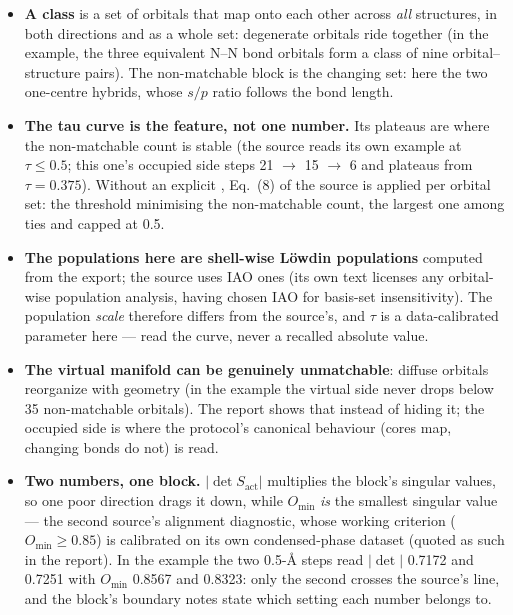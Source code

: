 \begin{readbox}
\begin{itemize}
  \item \textbf{A class} is a set of orbitals that map onto each other across
    \emph{all} structures, in both directions and as a whole set: degenerate
    orbitals ride together (in the example, the three equivalent N--N bond
    orbitals form a class of nine orbital--structure pairs).  The
    non-matchable block is the changing set: here the two one-centre hybrids,
    whose $s/p$ ratio follows the bond length.
  \item \textbf{The tau curve is the feature, not one number.}  Its plateaus
    are where the non-matchable count is stable (the source reads its own
    example at $\tau \le 0.5$; this one's occupied side steps 21 $\to$ 15
    $\to$ 6 and plateaus from $\tau = 0.375$).  Without an explicit
    , Eq.~(8) of the source is applied per orbital set: the
    threshold minimising the non-matchable count, the largest one among ties
    and capped at 0.5.
  \item \textbf{The populations here are shell-wise L\"owdin populations}
    computed from the export; the source uses IAO ones (its own text licenses
    any orbital-wise population analysis, having chosen IAO for basis-set
    insensitivity).  The population \emph{scale} therefore differs from the
    source's, and $\tau$ is a data-calibrated parameter here --- read the
    curve, never a recalled absolute value.
  \item \textbf{The virtual manifold can be genuinely unmatchable}: diffuse
    orbitals reorganize with geometry (in the example the virtual side never
    drops below 35 non-matchable orbitals).  The report shows that instead of
    hiding it; the occupied side is where the protocol's canonical behaviour
    (cores map, changing bonds do not) is read.
  \item \textbf{Two numbers, one block.}  $|\det S_{\mathrm{act}}|$ multiplies
    the block's singular values, so one poor direction drags it down, while
    $O_{\min}$ \emph{is} the smallest singular value --- the second source's
    alignment diagnostic, whose working criterion ($O_{\min} \ge 0.85$) is
    calibrated on its own condensed-phase dataset (quoted as such in the
    report).  In the example the two 0.5-\AA{} steps read $|\det|$ 0.7172 and
    0.7251 with $O_{\min}$ 0.8567 and 0.8323: only the second crosses the
    source's line, and the block's boundary notes state which setting each
    number belongs to.
\end{itemize}
\end{readbox}

